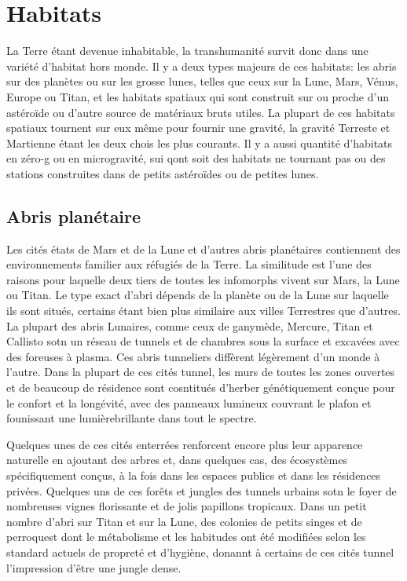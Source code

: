                \section{Habitats} \label{sec:habitats} 

               La Terre étant devenue inhabitable, la transhumanité survit donc dans une variété d'habitat hors monde. Il y a deux types majeurs de ces habitats: les abris sur des planètes ou sur les grosse lunes, telles que ceux sur la Lune, Mars, Vénus, Europe ou Titan, et les habitats spatiaux qui sont construit sur ou proche d'un astéroïde ou d'autre source de matériaux bruts utiles. La plupart de ces habitats spatiaux tournent sur eux même pour fournir une gravité, la gravité Terreste et Martienne étant les deux chois les plus courants. Il y a aussi quantité d'habitats en zéro-g ou en microgravité, sui qont soit des habitats ne tournant pas ou des stations construites dans de petits astéroïdes ou de petites lunes. 

               \subsection{Abris planétaire} \label{sec:plan-settl} 

               Les cités états de Mars et de la Lune et d'autres abris planétaires contiennent des environnements familier aux réfugiés de la Terre. La similitude est l'une des raisons pour laquelle deux tiers de toutes les infomorphs vivent sur Mars, la Lune ou Titan. Le type exact d'abri dépends de la planète ou de la Lune sur laquelle ils sont situés, certains étant bien plus similaire aux villes Terrestres que d'autres. La plupart des abris Lunaires, comme ceux de ganymède, Mercure, Titan et Callisto sotn un réseau de tunnels et de chambres sous la surface et excavées avec des foreuses à plasma. Ces abris tunneliers diffèrent légèrement d'un monde à l'autre. Dans la plupart de ces cités tunnel, les murs de toutes les zones ouvertes et de beaucoup de résidence sont cosntitués d'herber génétiquement conçue pour le confort et la longévité, avec des panneaux lumineux couvrant le plafon et founissant une lumièrebrillante dans tout le spectre. 

               Quelques unes de ces cités enterrées renforcent encore plus leur apparence naturelle en ajoutant des arbres et, dans quelques cas, des écosystèmes spécifiquement conçus, à la fois dans les espaces publics et dans les résidences privées. Quelques uns de ces forêts et jungles des tunnels urbains sotn le foyer de nombreuses vignes florissante et de jolis papillons tropicaux. Dans un petit nombre d'abri sur Titan et sur la Lune, des colonies de petits singes et de perroquest dont le métabolisme et les habitudes ont été modifiées selon les standard actuels de propreté et d'hygiène, donannt à certains de ces cités tunnel l'impression d'être une jungle dense. 

